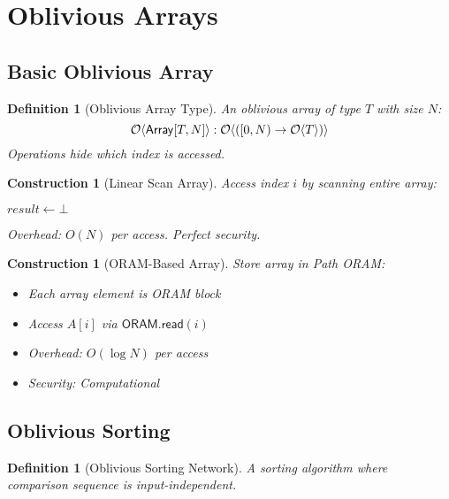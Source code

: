 \documentclass[11pt,final,hidelinks]{article}
\newcommand{\Array}{\mathsf{Array}}
\newcommand{\Read}{\mathsf{read}}
\newtheorem{definition}[theorem]{Definition}
\newtheorem{construction}[theorem]{Construction}
\begin{document}
\section{Oblivious Arrays}

\subsection{Basic Oblivious Array}

\begin{definition}[Oblivious Array Type]
An oblivious array of type $T$ with size $N$:
\begin{equation}
\Obv{\Array[T, N]} : \ObvMap{[0, N)}{\Obv{T}}
\end{equation}
Operations hide which index is accessed.
\end{definition}

\begin{construction}[Linear Scan Array]
Access index $i$ by scanning entire array:
\begin{algorithm}[H]
\caption{Linear Scan Read}
$result \gets \bot$\;
\end{algorithm}
Overhead: $O(N)$ per access. Perfect security.
\end{construction}

\begin{construction}[ORAM-Based Array]
Store array in Path ORAM:
\begin{itemize}
    \item Each array element is ORAM block
    \item Access $A[i]$ via $\mathsf{ORAM}.\Read(i)$
    \item Overhead: $O(\log N)$ per access
    \item Security: Computational
\end{itemize}
\end{construction}

\subsection{Oblivious Sorting}

\begin{definition}[Oblivious Sorting Network]
A sorting algorithm where comparison sequence is input-independent.
\end{definition}
\end{document}
